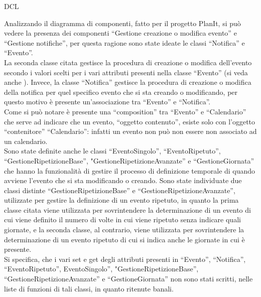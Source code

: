 \begin{listaPersonale}{DCL}
\begin{listaPersonale2}[DCL]{}


        Analizzando il diagramma di componenti, fatto per il progetto PlanIt, si può vedere la presenza dei componenti “Gestione creazione o modifica evento” e “Gestione notifiche”, per questa ragione sono state ideate le classi “Notifica” e “Evento”. \\
        La seconda classe citata gestisce la procedura di creazione o modifica dell'evento secondo i valori scelti per i vari attributi presenti nella classe “Evento” (si veda anche ). Invece, la classe “Notifica” gestisce la procedura di creazione o modifica della notifica per quel specifico evento che si sta creando o modificando, per questo motivo è presente un'associazione tra “Evento” e “Notifica”.\\
        Come si può notare è presente una “composition” tra “Evento” e “Calendario” che serve ad indicare che un evento, “oggetto contenuto”, esiste solo con l'oggetto “contenitore” “Calendario”: infatti un evento non può non essere non associato ad un calendario.\\
        Sono state definite anche le classi “EventoSingolo”, “EventoRipetuto”, “GestioneRipetizioneBase”, "GestioneRipetizioneAvanzate” e “GestioneGiornata” che hanno la funzionalità di gestire il processo di definizione temporale di quando avviene l'evento che si sta modificando o creando. Sono state individuate due classi distinte “GestioneRipetizioneBase” e “GestioneRipetizioneAvanzate”, utilizzate per gestire la definizione di un evento ripetuto, in quanto la prima classe citata viene utilizzata per sovrintendere la determinazione di un evento di cui viene definito il numero di volte in cui viene ripetuto senza indicare quali giornate, e la seconda classe, al contrario, viene utilizzata per sovrintendere la determinazione di un evento ripetuto di cui si indica anche le giornate in cui è presente. \\
        Si specifica, che i vari set e get degli attributi presenti in “Evento”, “Notifica”, “EventoRipetuto”, EventoSingolo”, "GestioneRipetizioneBase”, “GestioneRipetizioneAvanzate” e “GestioneGiornata” non sono stati scritti, nelle liste di funzioni di tali classi, in quanto ritenute banali.



\end{listaPersonale2}
\end{listaPersonale}
